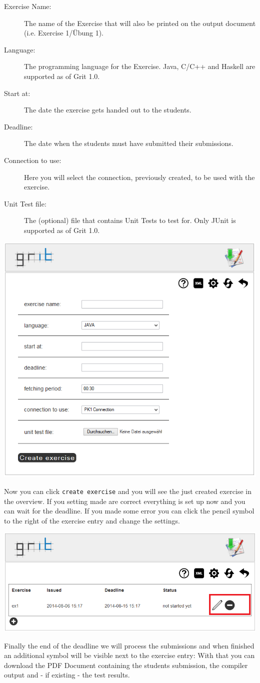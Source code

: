 \documentclass[10pt,a4paper, titlepage, toc=idx]{scrreprt}
\theoremstyle{definition}
\theoremstyle{plain}
\newcommand*{\product}{Grit}
\newcommand*{\version}{1.0}
\begin{document}
	\begin{description}
        \item[Exercise Name:] The name of the Exercise that will also
          be printed on the output document (i.e. Exercise 1/Übung 1).
        \item[Language:] The programming language for the
          Exercise. Java, C/C++ and Haskell are supported as of
          \product{} \version.
        \item[Start at:] The date the exercise gets handed out to the
          students.
        \item[Deadline:] The date when the students must have
          submitted their submissions.
        \item[Connection to use:] Here you will select the connection,
          previously created, to be used with the exercise.
        \item[Unit Test file:] The (optional) file that contains Unit
          Tests to test for. Only JUnit is supported as of \product{}
          \version.
	\end{description}
	\begin{center}
          \includegraphics[width=.55\textwidth]{pictures/create_exercise.png}
	\end{center}
	Now you can click {\tt create exercise} and you will see the
        just created exercise in the overview. If you setting made are
        correct everything is set up now and you can wait for the
        deadline. If you made some error you can click the pencil
        symbol to the right of the exercise entry and change the
        settings.
	\begin{center}
          \includegraphics[width=.55\textwidth]{pictures/exercise_overview2.png}
	\end{center}
	Finally the end of the deadline we will process the
        submissions and when finished an additional symbol will be
        visible next to the exercise entry: With that you can download
        the PDF Document containing the students submission, the
        compiler output and - if existing - the test results.
\end{document}
